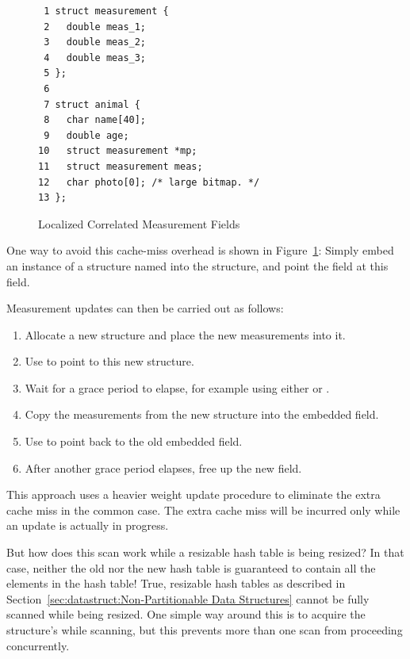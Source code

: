 \begin{enumerate}
\begin{figure}[tbp]
{ \scriptsize
\begin{verbatim}
 1 struct measurement {
 2   double meas_1;
 3   double meas_2;
 4   double meas_3;
 5 };
 6 
 7 struct animal {
 8   char name[40];
 9   double age;
10   struct measurement *mp;
11   struct measurement meas;
12   char photo[0]; /* large bitmap. */
13 };
\end{verbatim}
}
\caption{Localized Correlated Measurement Fields}
\label{fig:together:Localized Correlated Measurement Fields}
\end{figure}

	One way to avoid this cache-miss overhead is shown in
	Figure~\ref{fig:together:Localized Correlated Measurement Fields}:
	Simply embed an instance of a  structure
	named 
	into the  structure, and point the 
	field at this  field.

	Measurement updates can then be carried out as follows:

	\begin{enumerate}
	\item	Allocate a new  structure and place
		the new measurements into it.
	\item	Use  to point  to
		this new structure.
	\item	Wait for a grace period to elapse, for example using
		either  or .
	\item	Copy the measurements from the new 
		structure into the embedded  field.
	\item	Use  to point 
		back to the old embedded  field.
	\item	After another grace period elapses, free up the
		new  field.
	\end{enumerate}

	This approach uses a heavier weight update procedure to eliminate
	the extra cache miss in the common case.
	The extra cache miss will be incurred only while an update is
	actually in progress.

\QuickQ{}
	But how does this scan work while a resizable hash table
	is being resized?
	In that case, neither the old nor the new hash table is
	guaranteed to contain all the elements in the hash table!
\QuickA{}
	True, resizable hash tables as described in
	Section~\ref{sec:datastruct:Non-Partitionable Data Structures}
	cannot be fully scanned while being resized.
	One simple way around this is to acquire the
	 structure's  while scanning,
	but this prevents more than one scan from proceeding
	concurrently.


\end{enumerate}
